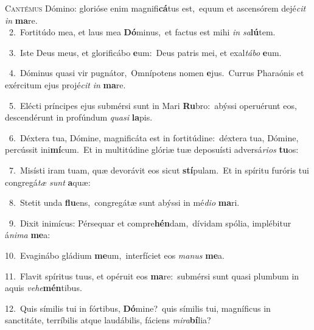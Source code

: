 \lettrine{\initial\textcolor{\initialcolor}{C}}{antémus} Dómino: glorióse enim magnifi\-\textbf{cá}\-tus est,~\star equum et ascensórem dejé\textit{cit} \textit{in} \textbf{ma}\-re.\\
{\numbfont\textcolor{\numbcolor}{~2.}}~Fortitúdo mea, et laus mea \textbf{Dó}\-minus,~\star et factus est mihi \textit{in} \textit{sa}\-\textbf{lú}tem.\par
{\numbfont\textcolor{\numbcolor}{~3.}}~Iste Deus meus, et glorificábo \textbf{e}\-um:~\star Deus patris mei, et exal\-\textit{tá}\-\textit{bo} \textbf{e}\-um.\par
{\numbfont\textcolor{\numbcolor}{~4.}}~Dóminus quasi vir pugnátor,~\dagger Omnípotens nomen \textbf{e}\-jus.~\star Currus Pharaónis et exércitum ejus projé\textit{cit} \textit{in} \textbf{ma}\-re.\par
{\numbfont\textcolor{\numbcolor}{~5.}}~Elécti príncipes ejus submérsi sunt in Mari \textbf{Ru}\-bro:~\star abýssi operuérunt eos, descendérunt in profúndum \textit{qua}\-\textit{si} \textbf{la}\-pis.\par
{\numbfont\textcolor{\numbcolor}{~6.}}~Déxtera tua, Dómine, magnificáta est in fortitúdine:~\dagger déxtera tua, Dómine, percússit ini\-\textbf{mí}\-cum.~\star Et in multitúdine glóriæ tuæ deposuísti adversá\-\textit{ri}\-\textit{os} \textbf{tu}\-os:\par
{\numbfont\textcolor{\numbcolor}{~7.}}~Misísti iram tuam, quæ devorávit eos sicut \textbf{stí}\-pulam.~\star Et in spíritu furóris tui congregá\textit{tæ} \textit{sunt} \textbf{a}\-quæ:\par
{\numbfont\textcolor{\numbcolor}{~8.}}~Stetit unda \textbf{flu}\-ens,~\star congregátæ sunt abýssi in mé\-\textit{di}\-\textit{o} \textbf{ma}\-ri.\par
{\numbfont\textcolor{\numbcolor}{~9.}}~Dixit inimícus: Pérsequar et compre\-\textbf{hén}\-dam,~\star dívidam spólia, implébitur á\-\textit{ni}\-\textit{ma} \textbf{me}\-a:\par
{\numbfont\textcolor{\numbcolor}{10.}}~Evaginábo gládium \textbf{me}\-um,~\star interfíciet eos \textit{ma}\-\textit{nus} \textbf{me}\-a.\par
{\numbfont\textcolor{\numbcolor}{11.}}~Flavit spíritus tuus, et opéruit eos \textbf{ma}\-re:~\star submérsi sunt quasi plumbum in aquis \textit{ve}\-\textit{he}\textbf{mén}tibus.\par
{\numbfont\textcolor{\numbcolor}{12.}}~Quis símilis tui in fórtibus, \textbf{Dó}\-mine?~\star quis símilis tui, magníficus in sanctitáte, terríbilis atque laudábilis, fáciens \textit{mi}\-\textit{ra}\textbf{bí}lia?\par
